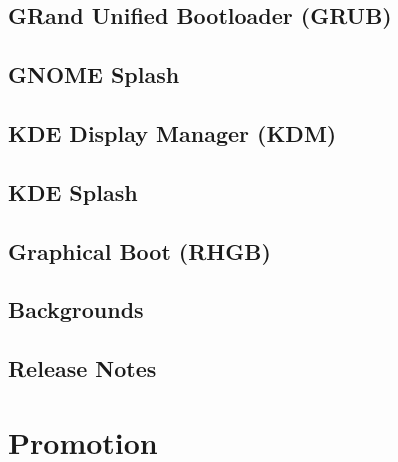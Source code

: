\documentclass[12pt]{book}
\begin{document}
\chapter{GRand Unified Bootloader (GRUB)}
   \hypertarget{cha:Distribution:BootUp:GRUB}{}
   \label{cha:Distribution:BootUp:GRUB}

\chapter{GNOME Splash}
   \hypertarget{cha:Distribution:BootUp:GSplash}{}
   \label{cha:Distribution:BootUp:GSplash}

\chapter{KDE Display Manager (KDM)}
   \hypertarget{cha:Distribution:BootUp:KDM}{}
   \label{cha:Distribution:BootUp:KDM}

\chapter{KDE Splash}
   \hypertarget{cha:Distribution:BootUp:KSplash}{}
   \label{cha:Distribution:BootUp:KSplash}

\chapter{Graphical Boot (RHGB)}
   \hypertarget{cha:Distribution:BootUp:RHGB}{}
   \label{cha:Distribution:BootUp:RHGB}

\chapter{Backgrounds}
   \hypertarget{cha:Distribution:Backgrounds}{}
   \label{cha:Distribution:Backgrounds}
   
   
   

\chapter{Release Notes}
   \hypertarget{cha:Distribution:ReleaseNotes}{}
   \label{cha:Distribution:ReleaseNotes}

\part{Promotion}
\end{document}
